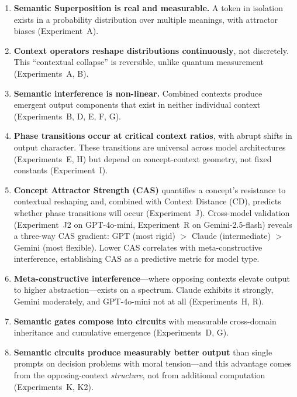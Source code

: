\documentclass[11pt,a4paper]{article}
\begin{document}
\begin{enumerate}[leftmargin=*]
\item \textbf{Semantic Superposition is real and measurable.} A token in isolation exists in a probability distribution over multiple meanings, with attractor biases (Experiment~A).

\item \textbf{Context operators reshape distributions continuously}, not discretely. This ``contextual collapse'' is reversible, unlike quantum measurement (Experiments~A, B).

\item \textbf{Semantic interference is non-linear.} Combined contexts produce emergent output components that exist in neither individual context (Experiments~B, D, E, F, G).

\item \textbf{Phase transitions occur at critical context ratios}, with abrupt shifts in output character. These transitions are universal across model architectures (Experiments~E, H) but depend on concept-context geometry, not fixed constants (Experiment~I).

\item \textbf{Concept Attractor Strength (CAS)} quantifies a concept's resistance to contextual reshaping and, combined with Context Distance (CD), predicts whether phase transitions will occur (Experiment~J). Cross-model validation (Experiment~J2 on GPT-4o-mini, Experiment~R on Gemini-2.5-flash) reveals a three-way CAS gradient: GPT (most rigid) $>$ Claude (intermediate) $>$ Gemini (most flexible). Lower CAS correlates with meta-constructive interference, establishing CAS as a predictive metric for model type.

\item \textbf{Meta-constructive interference}---where opposing contexts elevate output to higher abstraction---exists on a spectrum. Claude exhibits it strongly, Gemini moderately, and GPT-4o-mini not at all (Experiments~H, R).

\item \textbf{Semantic gates compose into circuits} with measurable cross-domain inheritance and cumulative emergence (Experiments~D, G).

\item \textbf{Semantic circuits produce measurably better output} than single prompts on decision problems with moral tension---and this advantage comes from the opposing-context \emph{structure}, not from additional computation (Experiments~K, K2).


\end{enumerate}
\end{document}
